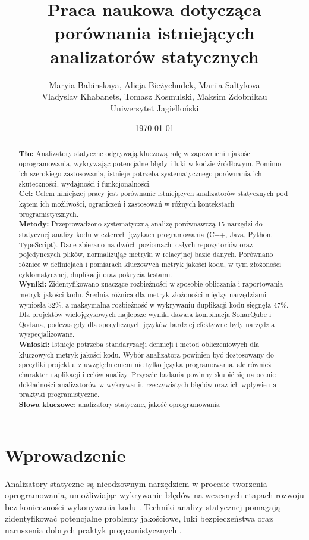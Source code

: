 \documentclass[a4paper,12pt]{article}
\title{Praca naukowa dotycząca porównania istniejących analizatorów statycznych}
\author{Maryia Babinskaya, Alicja Bieżychudek, Mariia Saltykova \\ Vladyslav Khabanets, Tomasz Kosmulski, Maksim Zdobnikau \\ Uniwersytet Jagielloński}
\date{\today}
\begin{document}
\maketitle

\begin{abstract}
\noindent
\textbf{Tło:} Analizatory statyczne odgrywają kluczową rolę w zapewnieniu jakości oprogramowania, wykrywając potencjalne błędy i luki w kodzie źródłowym. Pomimo ich szerokiego zastosowania, istnieje potrzeba systematycznego porównania ich skuteczności, wydajności i funkcjonalności.\\
\textbf{Cel:} Celem niniejszej pracy jest porównanie istniejących analizatorów statycznych pod kątem ich możliwości, ograniczeń i zastosowań w różnych kontekstach programistycznych.\\
\textbf{Metody:} Przeprowadzono systematyczną analizę porównawczą 15 narzędzi do statycznej analizy kodu w czterech językach programowania (C++, Java, Python, TypeScript). Dane zbierano na dwóch poziomach: całych repozytoriów oraz pojedynczych plików, normalizując metryki w relacyjnej bazie danych. Porównano różnice w definicjach i pomiarach kluczowych metryk jakości kodu, w tym złożoności cyklomatycznej, duplikacji oraz pokrycia testami.\\
\textbf{Wyniki:} Zidentyfikowano znaczące rozbieżności w sposobie obliczania i raportowania metryk jakości kodu. Średnia różnica dla metryk złożoności między narzędziami wyniosła 32\%, a maksymalna rozbieżność w wykrywaniu duplikacji kodu sięgnęła 47\%. Dla projektów wielojęzykowych najlepsze wyniki dawała kombinacja SonarQube i Qodana, podczas gdy dla specyficznych języków bardziej efektywne były narzędzia wyspecjalizowane.\\
\textbf{Wnioski:} Istnieje potrzeba standaryzacji definicji i metod obliczeniowych dla kluczowych metryk jakości kodu. Wybór analizatora powinien być dostosowany do specyfiki projektu, z uwzględnieniem nie tylko języka programowania, ale również charakteru aplikacji i celów analizy. Przyszłe badania powinny skupić się na ocenie dokładności analizatorów w wykrywaniu rzeczywistych błędów oraz ich wpływie na praktyki programistyczne.\\
\vspace{0.5cm}
\noindent
\textbf{Słowa kluczowe:} analizatory statyczne, jakość oprogramowania
\end{abstract}

\section{Wprowadzenie}
Analizatory statyczne są nieodzownym narzędziem w procesie tworzenia oprogramowania, umożliwiając wykrywanie błędów na wczesnych etapach rozwoju bez konieczności wykonywania kodu \cite{sadowski2018lessons, livshits2005finding}. Techniki analizy statycznej pomagają zidentyfikować potencjalne problemy jakościowe, luki bezpieczeństwa oraz naruszenia dobrych praktyk programistycznych \cite{jovanovic2006pixy, zitser2004testing}. 
\end{document}
